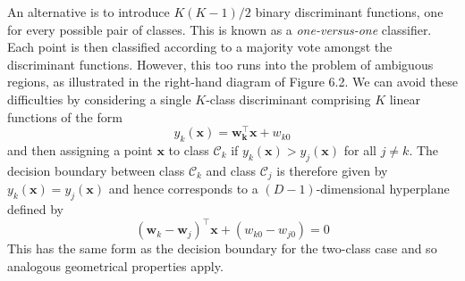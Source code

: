 \documentclass[twoside]{article}
\begin{document}
An alternative is to introduce $K(K - 1) / 2$ binary discriminant functions, one for every possible pair of classes. This is known as a \textit{one-versus-one} classifier. Each point is then classified according to a majority vote amongst the discriminant functions. However, this too runs into the problem of ambiguous regions, as illustrated in the right-hand diagram of Figure 6.2.
\newpage
We can avoid these difficulties by considering a single $K$-class discriminant comprising $K$ linear functions of the form
\begin{equation*}
    y_k(\boldsymbol{x}) = \boldsymbol{w_k^\intercal x} + w_{k0}
\end{equation*}
and then assigning a point $\boldsymbol{x}$ to class $\mathcal{C}_k$ if $y_k(\boldsymbol{x}) > y_j(\boldsymbol{x})$ for all $j \neq k$. The decision boundary between class $\mathcal{C}_k$ and class $\mathcal{C}_j$ is therefore given by $y_k(\boldsymbol{x}) = y_j(\boldsymbol{x})$ and hence corresponds to a $(D-1)$-dimensional hyperplane defined by
\begin{equation*}
    (\boldsymbol{w}_k - \boldsymbol{w}_j)^\intercal\boldsymbol{x} + (w_{k0} - w_{j0}) = 0
\end{equation*}
This has the same form as the decision boundary for the two-class case and so analogous geometrical properties apply.
\end{document}

